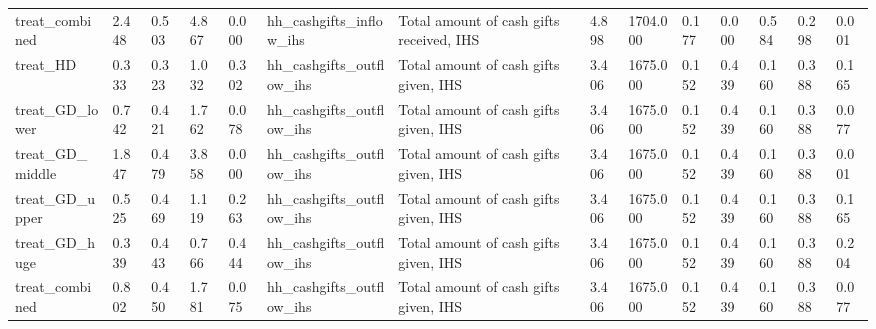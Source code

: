 \begin{tabular}{llllllllllllll}
treat\_combined & 2.448 & 0.503 & 4.867 & 0.000 & hh\_cashgifts\_inflow\_ihs & Total amount of cash gifts received, IHS & 4.898 & 1704.000 & 0.177 & 0.000 & 0.584 & 0.298 & 0.001 \\
treat\_HD & 0.333 & 0.323 & 1.032 & 0.302 & hh\_cashgifts\_outflow\_ihs & Total amount of cash gifts given, IHS & 3.406 & 1675.000 & 0.152 & 0.439 & 0.160 & 0.388 & 0.165 \\
treat\_GD\_lower & 0.742 & 0.421 & 1.762 & 0.078 & hh\_cashgifts\_outflow\_ihs & Total amount of cash gifts given, IHS & 3.406 & 1675.000 & 0.152 & 0.439 & 0.160 & 0.388 & 0.077 \\
treat\_GD\_middle & 1.847 & 0.479 & 3.858 & 0.000 & hh\_cashgifts\_outflow\_ihs & Total amount of cash gifts given, IHS & 3.406 & 1675.000 & 0.152 & 0.439 & 0.160 & 0.388 & 0.001 \\
treat\_GD\_upper & 0.525 & 0.469 & 1.119 & 0.263 & hh\_cashgifts\_outflow\_ihs & Total amount of cash gifts given, IHS & 3.406 & 1675.000 & 0.152 & 0.439 & 0.160 & 0.388 & 0.165 \\
treat\_GD\_huge & 0.339 & 0.443 & 0.766 & 0.444 & hh\_cashgifts\_outflow\_ihs & Total amount of cash gifts given, IHS & 3.406 & 1675.000 & 0.152 & 0.439 & 0.160 & 0.388 & 0.204 \\
treat\_combined & 0.802 & 0.450 & 1.781 & 0.075 & hh\_cashgifts\_outflow\_ihs & Total amount of cash gifts given, IHS & 3.406 & 1675.000 & 0.152 & 0.439 & 0.160 & 0.388 & 0.077 \\
\bottomrule
\end{tabular}
